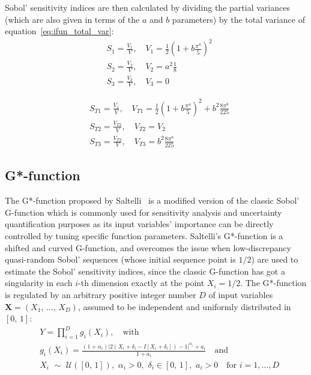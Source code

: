 \vspace{0.2cm}\noindent
Sobol' sensitivity indices are then calculated by dividing the partial variances (which are also given in terms of the $a$ and $b$ parameters) by the total variance of equation~\eqref{eq:ifun_total_var}:
%
\begin{align}
	& S_{1} = \frac{V_{1}}{V},\quad V_{1} = \frac{1}{2}\left(1 + b\frac{\pi^4}{5}\right)^2 \\
	& S_{2} = \frac{V_{2}}{V},\quad V_{2} = a^2\frac{1}{8} \\
	& S_{3} = \frac{V_{3}}{V},\quad V_{3} = 0
\end{align}

\begin{align}
	& S_{T1} = \frac{V_{1}}{V},\quad V_{T1} = \frac{1}{2}\left(1 + b\frac{\pi^4}{5}\right)^2 + b^2\frac{8\pi^8}{225} \\
	& S_{T2} = \frac{V_{T2}}{V},\quad V_{T2} = V_2 \\
	& S_{T3} = \frac{V_{T3}}{V},\quad V_{T3} = b^2\frac{8\pi^8}{225}
\end{align}


%
%
%
\subsection{G*-function}
The G*-function proposed by Saltelli~\cite{Saltelli:2010} is a modified version of the classic Sobol' G-function  which is commonly used for sensitivity analysis and uncertainty quantification purposes as its input variables' importance can be directly controlled by tuning specific function parameters. Saltelli's G*-function is a shifted and curved G-function, and overcomes the issue when low-discrepancy quasi-random Sobol' sequences (whose initial sequence point is $1/2$) are used to estimate the Sobol' sensitivity indices, since the classic G-function has got a singularity in each $i$-th dimension exactly at the point $X_{i}=1/2$. The G*-function is regulated by an arbitrary positive integer number $D$ of input variables $\mathbf{X}=(X_1,\,\dots,\,X_D)$, assumed to be independent and uniformly distributed in $[0,\,1]$: 
%
\begin{align}\label{eq:gstarfun}
	& Y = \prod_{i=1}^{D}g_i(X_i),\quad\text{with} \\
	& g_i(X_i)=\frac{(1+\alpha_i)\vert 2(X_i+\delta_i-I[X_i+\delta_i])-1\vert^{\alpha_i}+a_i}{1+a_i}\quad\text{and} \\
	& X_i\,\,\sim\,\,\mathcal{U}([0,\,1]),\,\,\alpha_i > 0,\,\,\delta_i\in [0,\,1],\,\,a_i>0\quad\text{for}\,\,i=1,\dots,D
\end{align}


